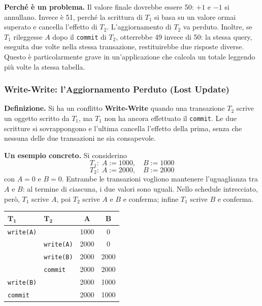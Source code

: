 \documentclass[12pt]{extarticle}
\begin{document}
\noindent \textbf{Perché è un problema.} Il valore finale dovrebbe essere 50: $+1$ e $-1$ si annullano. Invece è 51, perché la scrittura di $T_1$ si basa su un valore ormai superato e cancella l'effetto di $T_2$. L'aggiornamento di $T_2$ va perduto. Inoltre, se $T_1$ rileggesse $A$ dopo il \texttt{commit} di $T_2$, otterrebbe 49 invece di 50: la stessa query, eseguita due volte nella stessa transazione, restituirebbe due risposte diverse. Questo è particolarmente grave in un'applicazione che calcola un totale leggendo più volte la stessa tabella.

\subsubsection{Write-Write: l'Aggiornamento Perduto (Lost Update)}

\noindent \textbf{Definizione.} Si ha un conflitto \textbf{Write-Write} quando una transazione $T_2$ scrive un oggetto scritto da $T_1$, ma $T_1$ non ha ancora effettuato il \texttt{commit}. Le due scritture si sovrappongono e l'ultima cancella l'effetto della prima, senza che nessuna delle due transazioni ne sia consapevole.

\medskip
\noindent \textbf{Un esempio concreto.} Si considerino
\[
T_1:\; A:=1000,\quad B:=1000
\]
\[
T_2:\; A:=2000,\quad B:=2000
\]
con $A=0$ e $B=0$. Entrambe le transazioni vogliono mantenere l'uguaglianza tra $A$ e $B$: al termine di ciascuna, i due valori sono uguali. Nello schedule intrecciato, però, $T_1$ scrive $A$, poi $T_2$ scrive $A$ e $B$ e conferma; infine $T_1$ scrive $B$ e conferma.

\begin{center}
\small
\begin{tabular}{@{}llcc@{}}
    \toprule
    $\boldsymbol{T_1}$ & $\boldsymbol{T_2}$ & $\boldsymbol{A}$ & $\boldsymbol{B}$ \\
    \midrule
    \texttt{write(A)}      &      & 1000 & 0    \\
     & \texttt{write(A)}      & 2000 & 0    \\
     & \texttt{write(B)}      & 2000 & 2000 \\
     & \texttt{commit}        & 2000 & 2000 \\
    \texttt{write(B)}      &      & 2000 & 1000 \\
    \texttt{commit}        &      & 2000 & 1000 \\
    \bottomrule
\end{tabular}
\end{center}
\end{document}
